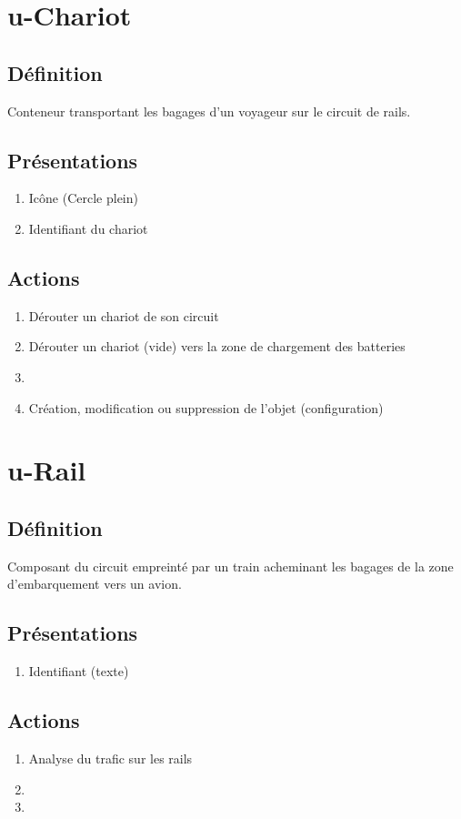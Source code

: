 \section{u-Chariot}
\subsection{Définition}
	Conteneur transportant les bagages d'un voyageur sur le circuit de rails.
\subsection{Présentations}
\begin{enumerate}
	\item Icône (Cercle plein)
	\item Identifiant du chariot
\end{enumerate}

\subsection{Actions}
\begin{enumerate}
	\item Dérouter un chariot de son circuit
	\item Dérouter un chariot (vide) vers la zone de chargement des batteries
	\item \etat
	\item Création, modification ou suppression de l'objet (configuration)
\end{enumerate}

\section{u-Rail}
\subsection{Définition}
	Composant du circuit empreinté par un train acheminant les bagages de la zone d'embarquement vers un avion.

\subsection{Présentations}
\begin{enumerate}
	\item Identifiant (texte)
\end{enumerate}

\subsection{Actions}
\begin{enumerate}
	\item Analyse du trafic sur les rails
	\item \etat 
	\item {}
\end{enumerate}


